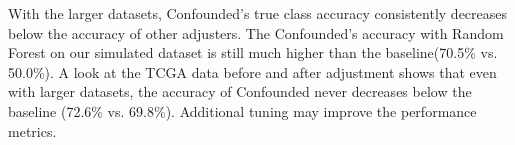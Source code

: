 \documentclass[11pt]{article}
\begin{document}
With the larger datasets, Confounded's true class accuracy consistently decreases below the accuracy of other adjusters.
The Confounded's accuracy with Random Forest on our simulated dataset is still much higher than the baseline(70.5\% vs. 50.0\%). %
A look at the TCGA data before and after adjustment shows that even with larger datasets, the accuracy of Confounded never decreases below the baseline (72.6\% vs. 69.8\%). 
Additional tuning may improve the performance metrics.
\end{document}
